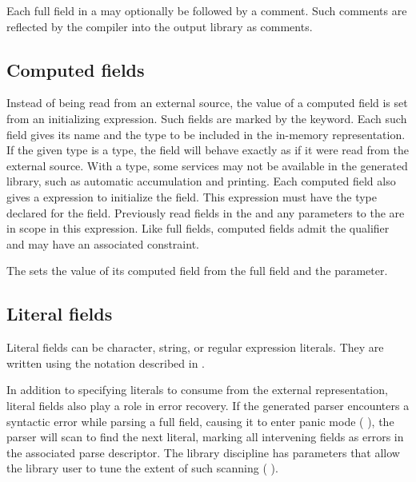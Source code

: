 Each full field in a \Pstruct{} may optionally be followed by a \PADSL{}
comment. Such comments are reflected by the \PADS{} compiler into the
output library as comments. 

\subsection{Computed fields}
\label{sec:structs-computed-fields}
Instead of being read from an external source, the value of a
computed field is set from an initializing expression.  Such fields
are marked by the \Pcompute{} keyword.  Each such field gives its name
and the type to be included in the in-memory representation.  
If the given type is a \pads{} type, the field will behave exactly as
if it were read from the external source.  With a \C{} type, some
services may not be available in the generated library, such as
automatic accumulation and printing.
Each computed field
also gives a \C{} expression to initialize the field.  This expression
must have the type declared for the field.  
Previously read fields in the \Pstruct{} and any parameters
to the \Pstruct{} are in scope in this expression.
Like full fields, computed fields admit the \Pomit{} qualifier and may
have an associated constraint.

The  \Pstruct{} sets the value of its computed
field  from the full field  and the 
parameter. 



\subsection{Literal fields}
\label{sec:structs-literal-fields}
Literal fields can be character, string, or regular expression literals.  They are 
written using the notation described in .  

In addition to specifying literals to consume from the external
representation, literal fields also play a role in error recovery.  If
the generated parser encounters a syntactic error while parsing a full
field, causing it to enter panic mode (\cf{}
), the parser will scan to find the next
literal, marking all intervening fields as errors in the
associated parse descriptor.  The library discipline has parameters
that allow the library user to tune the extent of such scanning
(\cf{} ).


